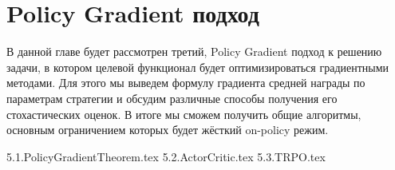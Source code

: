 \documentclass[../main.tex]{subfiles}
\begin{document}
\chapter{Policy Gradient подход}\label{policygradientchapter}

В данной главе будет рассмотрен третий, Policy Gradient подход к решению задачи, в котором целевой функционал будет оптимизироваться градиентными методами. Для этого мы выведем формулу градиента средней награды по параметрам стратегии и обсудим различные способы получения его стохастических оценок. В итоге мы сможем получить общие алгоритмы, основным ограничением которых будет жёсткий on-policy режим.

{5.1.PolicyGradientTheorem.tex}
{5.2.ActorCritic.tex}
{5.3.TRPO.tex}
\end{document}
